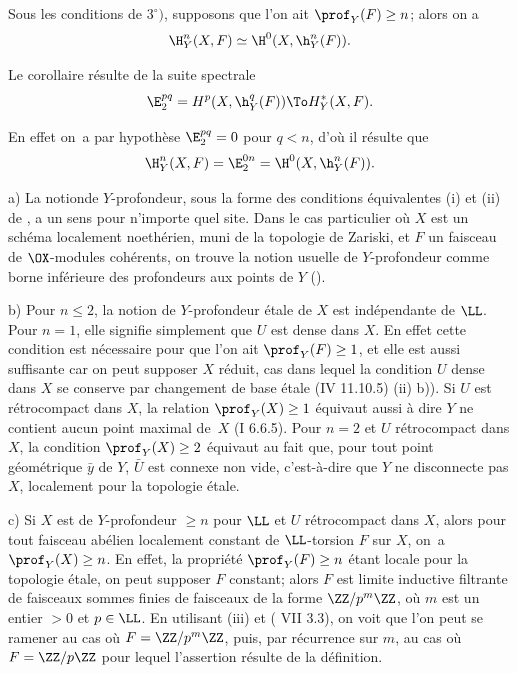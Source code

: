 \begin{corollaire} \label{XIV.1.5} Sous les conditions de  $3^\circ)$, supposons que l'on ait $\prof_Y(F)\geq n$; alors on a
$$
\H_Y^n(X, F)\simeq \H^0(X, {\h}_Y^n(F)).
$$
\end{corollaire}

Le corollaire r\'esulte de la suite spectrale
$$
\E_2^{pq}=H^p(X, {\h}_Y^q(F))\To H_Y^*(X, F).
$$

En effet on~a par hypoth\`ese $\E_2^{pq}=0$ pour $q<n$, d'o\`u il r\'esulte que
$$
\H_Y^n(X, F)=\E_2^{0n}=\H^0(X, {\h}_Y^n(F)).
$$

\skpt
\begin{remarques} \label{XIV.1.6}
a) La notion\pageoriginale de $Y$-profondeur, sous la forme des conditions \'equivalentes \textup{(i)} et \textup{(ii)} de , a un sens pour n'importe quel site. Dans le cas particulier o\`u $X$ est un sch\'ema localement noeth\'erien, muni de la topologie de Zariski, et $F$ un faisceau de $\OX$-modules coh\'erents, on trouve la notion usuelle de $Y$-profondeur comme borne inf\'erieure des profondeurs aux points de $Y$ ().

b) Pour $n\leq 2$, la notion de $Y$-profondeur \'etale de $X$ est ind\'ependante de $\LL$. Pour $n=1$, elle signifie simplement que $U$ est dense dans $X$. En effet cette condition est n\'ecessaire pour que l'on ait $\prof_Y(F)\geq 1$, et elle est aussi suffisante car on peut supposer $X$ r\'eduit, cas dans lequel la condition $U$ dense dans $X$ se conserve par changement de base \'etale \textup{(\EGA IV 11.10.5) \textup{(ii)} b))}. Si $U$ est r\'etrocompact dans $X$, la relation $\prof_Y(X)\geq 1$ \'equivaut aussi \`a dire $Y$ ne contient aucun point maximal de~$X$ (\EGA I 6.6.5). Pour $n=2$ et $U$ r\'etrocompact dans $X$, la condition $\prof_Y(X)\geq 2$ \'equivaut au fait que, pour tout point g\'eom\'etrique $\bar y$ de $Y$, $\bar U$ est connexe non vide, c'est-\`a-dire que \og $Y$ ne disconnecte pas $X$, localement pour la topologie \'etale\fg.

c) Si $X$ est de $Y$-profondeur $\geq n$ pour $\LL$ et $U$ r\'etrocompact dans $X$, alors pour tout faisceau ab\'elien localement constant de $\LL$-torsion $F$ sur $X$, on~a $\prof_Y(X)\geq n$. En effet, la propri\'et\'e $\prof_Y(F)\geq n$ \'etant locale pour la topologie \'etale, on peut supposer $F$ constant; alors $F$ est limite inductive filtrante de faisceaux sommes finies de faisceaux de la forme $\ZZ/p^m\ZZ$, o\`u $m$ est un entier $>0$ et $p\in \LL$. En utilisant  \textup{(iii)} et \textup{( VII 3.3)}, on voit que l'on peut se ramener au cas o\`u $F=\ZZ/p^m\ZZ$, puis\pageoriginale, par r\'ecurrence sur $m$, au cas o\`u $F=\ZZ/p\ZZ$ pour lequel l'assertion r\'esulte de la d\'efinition.


\end{remarques}
